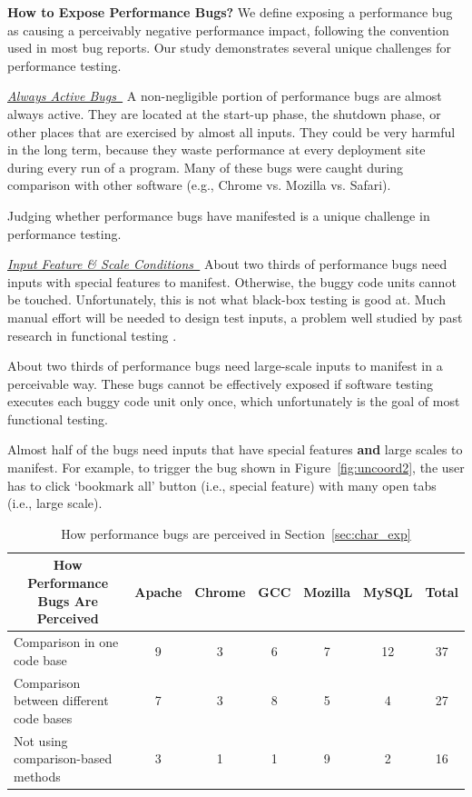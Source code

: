  

{\bf How to Expose Performance Bugs?} We define exposing a performance bug as causing a perceivably negative performance impact, 
following the convention used in most bug reports. Our study demonstrates several unique challenges for performance testing.

\underline{\it Always Active Bugs\ } 
A non-negligible portion of performance bugs are almost always active.
They are located at the start-up phase, the shutdown phase, or other places 
that are exercised by almost all inputs. 
They could be very harmful in the long term, because
they waste performance at every deployment site during every run of a program.
Many of these bugs were caught during comparison with other software
(e.g., Chrome vs. Mozilla vs. Safari).

Judging whether performance bugs have manifested is a unique challenge in 
performance testing.

\underline{\it Input Feature \& Scale Conditions\ } 
About two thirds of performance bugs need inputs with special features
to manifest. Otherwise, the buggy code units cannot be touched.
Unfortunately, this is not what black-box testing is good at.
Much manual effort will be needed to design test inputs, a problem
well studied by past research in functional testing \citep{KLEE,s2e}.


About two thirds of performance bugs need large-scale inputs to manifest in
a perceivable way. These bugs cannot be effectively exposed if 
software testing executes each buggy code unit only once,
which unfortunately is the goal of most functional testing.

Almost half of the bugs need inputs that have special features {\bf and} 
large scales to manifest. 
For example, to trigger the bug shown in Figure~\ref{fig:uncoord2}, the user
has to click `bookmark all' button (i.e., special feature) with many open
tabs (i.e., large scale).




\begin{table}[tb!]
\begin{adjustwidth}{-.5in}{-.5in}
\scriptsize
\centering
{
\begin{tabular}{lcccccc}
\toprule
\multicolumn{1}{c}{\bf How Performance Bugs Are Perceived} &Apache&Chrome&GCC&Mozilla&MySQL&Total\\
\midrule
\multicolumn{1}{l}{Comparison in one code base}
&9&3&6&7&12&37\\
\midrule
\multicolumn{1}{l}{Comparison between different code bases}
&7&3&8&5&4&27\\
\midrule
\multicolumn{1}{l}{Not using comparison-based methods}
&3&1&1&9&2&16\\
\bottomrule
\end{tabular}
}
\end{adjustwidth}
\caption{How performance bugs are perceived in Section~\ref{sec:char_exp}}
\label{tab:cmp}
\end{table}

